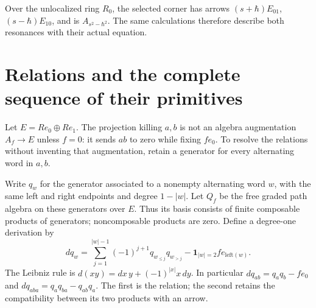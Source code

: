 Over the unlocalized ring \(R_0\), the selected corner has arrows
\((s+\hbar)E_{01}\), \((s-\hbar)E_{10}\), and is
\(A_{s^2-\hbar^2}\). The same calculations therefore describe both
resonances with their actual equation.

\section{Relations and the complete sequence of their primitives}

Let \(E=Re_0\oplus Re_1\). The projection killing \(a,b\) is not
an algebra augmentation \(A_f\to E\) unless \(f=0\): it sends \(ab\)
to zero while fixing \(fe_0\). To resolve the relations without
inventing that augmentation, retain a generator for every alternating
word in \(a,b\).

Write \(q_w\) for the generator associated to a nonempty alternating
word \(w\), with the same left and right endpoints and degree
\(1-|w|\). Let \(Q_f\) be the free graded path algebra on these
generators over \(E\). Thus its basis consists of finite composable
products of generators; noncomposable products are zero. Define a
degree-one derivation by
\begin{equation}\label{eq:fc-cobar}
 dq_w=\sum_{j=1}^{|w|-1}(-1)^{j+1}
             q_{w_{\leq j}}q_{w_{>j}}
       -\mathbf1_{|w|=2}fe_{\mathrm{left}(w)}.
\end{equation}
The Leibniz rule is \(d(xy)=dx\,y+(-1)^{|x|}x\,dy\).
In particular \(dq_{ab}=q_aq_b-fe_0\) and
\(dq_{aba}=q_aq_{ba}-q_{ab}q_a\). The first is the relation;
the second retains the compatibility between its two products with
an arrow.

